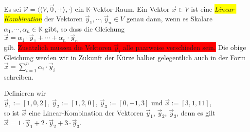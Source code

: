 \begin{Definition} \lb
Es sei $\mathcal{V} = \bigl\langle \langle V, \vec{0}, + \rangle, \cdot \bigr\rangle$ ein $\mathbb{K}$-Vektor-Raum.  Ein Vektor $\vec{x} \in V$ ist eine
\colorbox{yellow}{\emph{Linear-Kombination}} der Vektoren $\vec{y}_1, \cdots, \vec{y}_n \in V$ genau dann, wenn es Skalare
$\alpha_1, \cdots, \alpha_n \in \mathbb{K}$ gibt, so dass die Gleichung
\\[0.2cm]
\hspace*{1.3cm}
$\vec{x} = \alpha_1 \cdot \vec{y}_1 + \cdots + \alpha_n \cdot \vec{y}_n$
\\[0.2cm]
gilt.  
\colorbox{red}{Zus\"{a}tzlich m\"{u}ssen die Vektoren $\vec{y}_i$ alle paarweise verschieden sein.}
Die obige Gleichung werden wir in Zukunft der K\"{u}rze halber gelegentlich auch in der Form
\\[0.2cm]
\hspace*{1.3cm}
$\vec{x} = \sum\limits_{i=1}^n \alpha_i \cdot \vec{y}_i$
\\[0.2cm]
schreiben.
\eoxs
\end{Definition}

\example
Definieren wir
\\[0.2cm]
\hspace*{1.3cm}
$\vec{y}_1 := [1, 0, 2]$, \quad  $\vec{y}_2 := [1, 2, 0]$, \quad  $\vec{y}_3 := [0, -1, 3]$  \quad und \quad  $\vec{x} := [3, 1, 11]$,
\\[0.2cm]
so ist $\vec{x}$ eine Linear-Kombination der Vektoren $\vec{y}_1$, $\vec{y}_2$, $\vec{y}_3$, denn es gilt
\\[0.2cm]
\hspace*{1.3cm}
$\vec{x} = 1 \cdot \vec{y}_1 + 2 \cdot \vec{y}_2 + 3 \cdot \vec{y}_3$.  \eoxs

